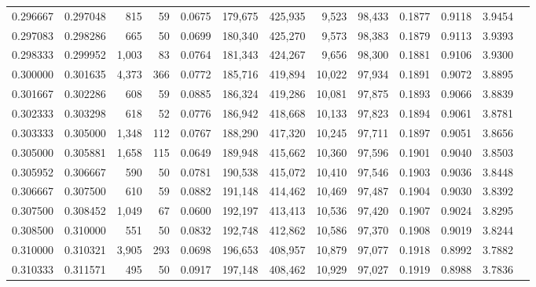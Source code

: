 \begin{tabular}{rrrrrrrrrrrrr}
0.296667 & 0.297048 &   815 &  59 &                                     0.0675 & 179,675 & 425,935 &   9,523 &  98,433 & 0.1877 & 0.9118 & 3.9454 \\
0.297083 & 0.298286 &   665 &  50 &                                     0.0699 & 180,340 & 425,270 &   9,573 &  98,383 & 0.1879 & 0.9113 & 3.9393 \\
0.298333 & 0.299952 & 1,003 &  83 &                                     0.0764 & 181,343 & 424,267 &   9,656 &  98,300 & 0.1881 & 0.9106 & 3.9300 \\
0.300000 & 0.301635 & 4,373 & 366 &                                     0.0772 & 185,716 & 419,894 &  10,022 &  97,934 & 0.1891 & 0.9072 & 3.8895 \\
0.301667 & 0.302286 &   608 &  59 &                                     0.0885 & 186,324 & 419,286 &  10,081 &  97,875 & 0.1893 & 0.9066 & 3.8839 \\
0.302333 & 0.303298 &   618 &  52 &                                     0.0776 & 186,942 & 418,668 &  10,133 &  97,823 & 0.1894 & 0.9061 & 3.8781 \\
0.303333 & 0.305000 & 1,348 & 112 &                                     0.0767 & 188,290 & 417,320 &  10,245 &  97,711 & 0.1897 & 0.9051 & 3.8656 \\
0.305000 & 0.305881 & 1,658 & 115 &                                     0.0649 & 189,948 & 415,662 &  10,360 &  97,596 & 0.1901 & 0.9040 & 3.8503 \\
0.305952 & 0.306667 &   590 &  50 &                                     0.0781 & 190,538 & 415,072 &  10,410 &  97,546 & 0.1903 & 0.9036 & 3.8448 \\
0.306667 & 0.307500 &   610 &  59 &                                     0.0882 & 191,148 & 414,462 &  10,469 &  97,487 & 0.1904 & 0.9030 & 3.8392 \\
0.307500 & 0.308452 & 1,049 &  67 &                                     0.0600 & 192,197 & 413,413 &  10,536 &  97,420 & 0.1907 & 0.9024 & 3.8295 \\
0.308500 & 0.310000 &   551 &  50 &                                     0.0832 & 192,748 & 412,862 &  10,586 &  97,370 & 0.1908 & 0.9019 & 3.8244 \\
0.310000 & 0.310321 & 3,905 & 293 &                                     0.0698 & 196,653 & 408,957 &  10,879 &  97,077 & 0.1918 & 0.8992 & 3.7882 \\
0.310333 & 0.311571 &   495 &  50 &                                     0.0917 & 197,148 & 408,462 &  10,929 &  97,027 & 0.1919 & 0.8988 & 3.7836 \\

\end{tabular}
